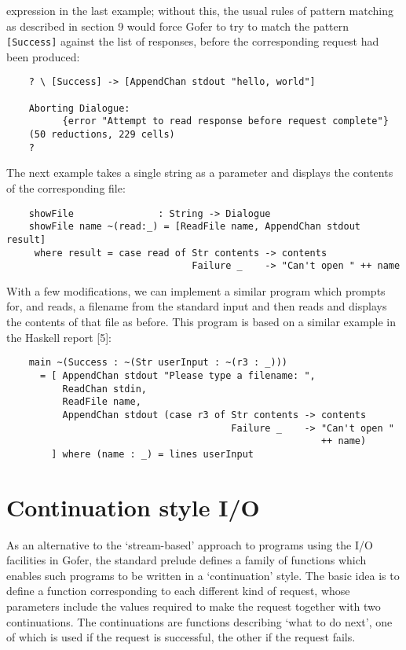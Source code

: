 expression in the last  example;  without  this,  the  usual  rules  of
pattern matching as described in section 9 would force Gofer to try  to
match the pattern \verb"[Success]" against the list of responses,  before  the
corresponding request had been produced:
\begin{verbatim}
    ? \ [Success] -> [AppendChan stdout "hello, world"]

    Aborting Dialogue:
          {error "Attempt to read response before request complete"}
    (50 reductions, 229 cells)
    ?
\end{verbatim}
The next example takes a single string as a parameter and displays  the
contents of the corresponding file:
\begin{verbatim}
    showFile               : String -> Dialogue 
    showFile name ~(read:_) = [ReadFile name, AppendChan stdout result] 
     where result = case read of Str contents -> contents 
                                 Failure _    -> "Can't open " ++ name 
\end{verbatim}
With a few modifications, we can  implement  a  similar  program  which
prompts for, and reads, a filename from the  standard  input  and  then
reads and displays the contents of that file as before.   This  program
is based on a similar example in the Haskell report [5]:
\begin{verbatim}
    main ~(Success : ~(Str userInput : ~(r3 : _)))  
      = [ AppendChan stdout "Please type a filename: ", 
          ReadChan stdin, 
          ReadFile name, 
          AppendChan stdout (case r3 of Str contents -> contents
                                        Failure _    -> "Can't open "
                                                        ++ name)
        ] where (name : _) = lines userInput
\end{verbatim}




\section{Continuation style I/O}
As an alternative to the `stream-based' approach to programs using  the
I/O facilities in Gofer, the  standard  prelude  defines  a  family  of
functions which enables such programs to be written in a `continuation'
style.  The basic idea is to define a function  corresponding  to  each
different kind of request, whose parameters include the values required
to make the request together with two continuations.  The continuations
are functions describing `what to do next', one of which is used if the
request is successful, the other if the request fails.

